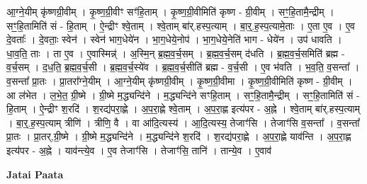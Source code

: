 \documentclass[17pt]{extarticle}
\begin{document}
आ॒ग्ने॒यीम् कृ॑ष्णग्री॒वीम् । कृ॒ष्ण॒ग्री॒वीꣳ सꣳ॑हि॒ताम् । कृ॒ष्ण॒ग्री॒वीमिति॑ कृष्ण - ग्री॒वीम् । सꣳ॒॒हि॒तामै॒न्द्रीम् । सꣳ॒॒हि॒तामिति॑ सं - हि॒ताम् । ऐ॒न्द्रीꣳ श्वे॒ताम् । श्वे॒ताम् बा॑र्.हस्प॒त्याम् । बा॒र्॒.ह॒स्प॒त्यामे॒ताः । ए॒ता ए॒व । ए॒व दे॒वताः᳚ । दे॒वताः॒ स्वेन॑ । स्वेन॑ भाग॒धेये॑न । भा॒ग॒धेये॒नोप॑ । भा॒ग॒धेये॒नेति॑ भाग - धेये॑न । उप॑ धावति । धा॒व॒ति॒ ताः । ता ए॒व । ए॒वास्मिन्न्॑ । अ॒स्मि॒न् ब्र॒ह्म॒व॒र्च॒सम् । ब्र॒ह्म॒व॒र्च॒सम् द॑धति । ब्र॒ह्म॒व॒र्च॒समिति॑ ब्रह्म - व॒र्च॒सम् । द॒ध॒ति॒ ब्र॒ह्म॒व॒र्च॒सी । ब्र॒ह्म॒व॒र्च॒स्ये॑व । ब्र॒ह्म॒व॒र्च॒सीति॑ ब्रह्म - व॒र्च॒सी । ए॒व भ॑वति । भ॒व॒ति॒ व॒सन्ता᳚ । व॒सन्ता᳚ प्रा॒तः । प्रा॒तरा᳚ग्ने॒यीम् । आ॒ग्ने॒यीम् कृ॑ष्णग्री॒वीम् । कृ॒ष्ण॒ग्री॒वीमा । कृ॒ष्ण॒ग्री॒वीमिति॑ कृष्ण - ग्री॒वीम् । आ ल॑भेत । ल॒भे॒त॒ ग्री॒ष्मे । ग्री॒ष्मे म॒द्ध्यन्दि॑ने । म॒द्ध्यन्दि॑ने सꣳहि॒ताम् । सꣳ॒॒हि॒तामै॒न्द्रीम् । सꣳ॒॒हि॒तामिति॑ सं - हि॒ताम् । ऐ॒न्द्रीꣳ श॒रदि॑ । श॒रद्य॑परा॒ह्णे । अ॒प॒रा॒ह्णे श्वे॒ताम् । अ॒प॒रा॒ह्ण इत्य॑पर - अ॒ह्ने । श्वे॒ताम् बा॑र्.हस्प॒त्याम् । बा॒र्॒.ह॒स्प॒त्याम् त्रीणि॑ । त्रीणि॒ वै । वा आ॑दि॒त्यस्य॑ । आ॒दि॒त्यस्य॒ तेजाꣳ॑सि । तेजाꣳ॑सि व॒सन्ता᳚ । व॒सन्ता᳚ प्रा॒तः । प्रा॒तर्,ग्री॒ष्मे । ग्री॒ष्मे म॒द्ध्यन्दि॑ने । म॒द्ध्यन्दि॑ने श॒रदि॑ । श॒रद्य॑परा॒ह्णे । अ॒प॒रा॒ह्णे याव॑न्ति । अ॒प॒रा॒ह्ण इत्य॑पर - अ॒ह्ने । याव॑न्त्ये॒व । ए॒व तेजाꣳ॑सि । तेजाꣳ॑सि॒ तानि॑ । तान्ये॒व । ए॒वाव॑ \newline

\textbf{Jatai Paata} \newline
\end{document}
